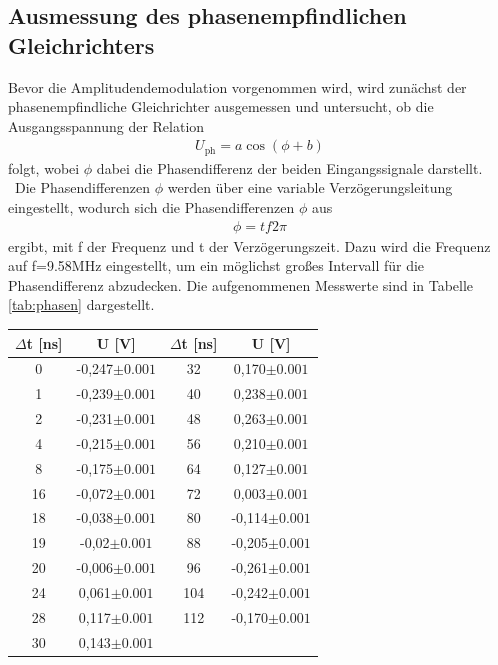 \documentclass[]{scrartcl}
\begin{document}
\subsection{Ausmessung des phasenempfindlichen Gleichrichters}
Bevor die Amplitudendemodulation vorgenommen wird, wird zunächst der phasenempfindliche Gleichrichter ausgemessen und untersucht, ob die Ausgangsspannung der Relation
\begin{align}
U_{\text{ph}}=a\cos(\phi+b)
\label{eq:phasen}
\end{align}
folgt, wobei $\phi$ dabei die Phasendifferenz der beiden Eingangssignale darstellt. \\\
Die Phasendifferenzen $\phi$ werden über eine variable Verzögerungsleitung eingestellt, wodurch sich die Phasendifferenzen $\phi$ aus 
\begin{align}
\phi = tf2\pi
\end{align}
ergibt, mit f der Frequenz und t der Verzögerungszeit. Dazu wird die Frequenz auf f=9.58\si{MHz} eingestellt, um ein möglichst großes Intervall für die Phasendifferenz abzudecken. Die aufgenommenen Messwerte sind in Tabelle \ref{tab:phasen} dargestellt. \\
\begin{center}
	\begin{tabular}{|c|c||c|c|}
		\hline $\Delta$t [ns] & U [V] & $\Delta$t [ns] & U [V]\\
		\hline	0	&	-0,247$\pm0.001$	&	32	&	0,170$\pm0.001$	\\
		\hline	1	&	-0,239$\pm0.001$	&	40	&	0,238$\pm0.001$	\\
		\hline	2	&	-0,231$\pm0.001$	&	48	&	0,263$\pm0.001$	\\
		\hline	4	&	-0,215$\pm0.001$	&	56	&	0,210$\pm0.001$	\\
		\hline	8	&	-0,175$\pm0.001$	&	64	&	0,127$\pm0.001$	\\
		\hline	16	&	-0,072$\pm0.001$	&	72	&	0,003$\pm0.001$	\\
		\hline	18	&	-0,038$\pm0.001$	&	80	&	-0,114$\pm0.001$	\\
		\hline	19	&	-0,02$\pm0.001$		&	88	&	-0,205$\pm0.001$	\\
		\hline	20	&	-0,006$\pm0.001$	&	96	&	-0,261$\pm0.001$	\\
		\hline	24	&	0,061$\pm0.001$		&	104	&	-0,242$\pm0.001$	\\
		\hline	28	&	0,117$\pm0.001$		&	112	&	-0,170$\pm0.001$	\\
		\hline	30	&	0,143$\pm0.001$		&		&	\\	
		\hline
	\end{tabular}
	\label{tab:phasen}
\end{center}
\end{document}
